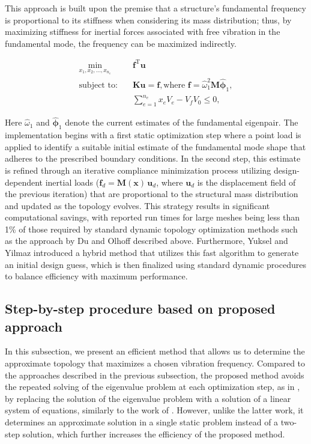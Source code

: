 \documentclass[pdflatex,lineno,sn-mathphys-ay]{sn-jnl}
\begin{document}
This approach is built upon the premise that a structure's fundamental frequency is proportional to its stiffness when considering its mass distribution; thus, by maximizing stiffness for inertial forces associated with free vibration in the fundamental mode, the frequency can be maximized indirectly.

\begin{align*}
\min_{x_1,x_2,\dots,x_{n_e}} \quad & \mathbf{f}^{\mathrm{T}} \mathbf{u} \\[8pt]
\text{subject to:} \quad & \mathbf{K}\mathbf{u} = \mathbf{f}, \text{where } \mathbf{f} = \hat{\omega}_1^2 \mathbf{M}\hat{\boldsymbol{\phi}}_1, \\[4pt]
& \sum_{e=1}^{n_e} x_e V_e - V_f V_0 \le 0,
\end{align*}

Here $\hat{\omega}_1$ and $\hat{\boldsymbol{\phi}}_1$ denote the current estimates of the fundamental eigenpair. The implementation begins with a first static optimization step where a point load is applied to identify a suitable initial estimate of the fundamental mode shape that adheres to the prescribed boundary conditions. In the second step, this estimate is refined through an iterative compliance minimization process utilizing design-dependent inertial loads ($\mathbf{f}_d = \mathbf{M}(\mathbf{x})\,\mathbf{u}_d$, where $\mathbf{u}_d$ is the displacement field of the previous iteration) that are proportional to the structural mass distribution and updated as the topology evolves. This strategy results in significant computational savings, with reported run times for large meshes being less than 1\% of those required by standard dynamic topology optimization methods such as the approach by Du and Olhoff described above. Furthermore, Yuksel and Yilmaz introduced a hybrid method that utilizes this fast algorithm to generate an initial design guess, which is then finalized using standard dynamic procedures to balance efficiency with maximum performance.

\subsection{Step-by-step procedure based on proposed approach}
In this subsection, we present an efficient method that allows us to determine the approximate topology that maximizes a chosen vibration frequency. Compared to the approaches described in the previous subsection, the proposed method avoids the repeated solving of the eigenvalue problem at each optimization step, as in \citet{Du2007}, by replacing the solution of the eigenvalue problem with a solution of a linear system of equations, similarly to the work of \citet{Yuksel2025}. However, unlike the latter work, it determines an approximate solution in a single static problem instead of a two-step solution, which further increases the efficiency of the proposed method.
\end{document}
